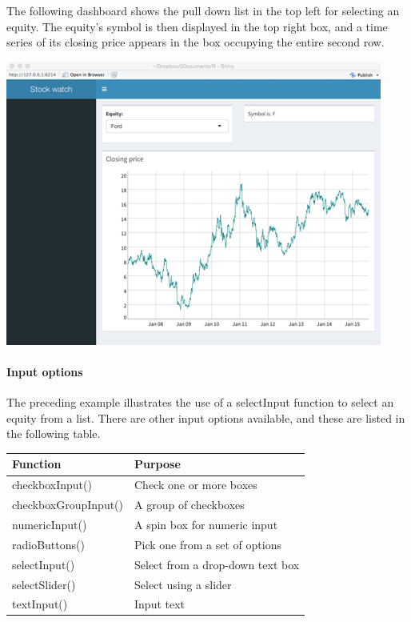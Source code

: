 \documentclass[
]{article}
\begin{document}
The following dashboard shows the pull down list in the top left for
selecting an equity. The equity's symbol is then displayed in the top
right box, and a time series of its closing price appears in the box
occupying the entire second row.

\includegraphics{Figures/Chapter 19/dashboard-8.png}

\hypertarget{input-options}{%
\paragraph*{Input options}\label{input-options}}

The preceding example illustrates the use of a selectInput function to
select an equity from a list. There are other input options available,
and these are listed in the following table.

\begin{longtable}[]{@{}ll@{}}
\toprule
Function & Purpose \\
\midrule
\endhead
checkboxInput() & Check one or more boxes \\
checkboxGroupInput() & A group of checkboxes \\
numericInput() & A spin box for numeric input \\
radioButtons() & Pick one from a set of options \\
selectInput() & Select from a drop-down text box \\
selectSlider() & Select using a slider \\
textInput() & Input text \\
\bottomrule
\end{longtable}
\end{document}
